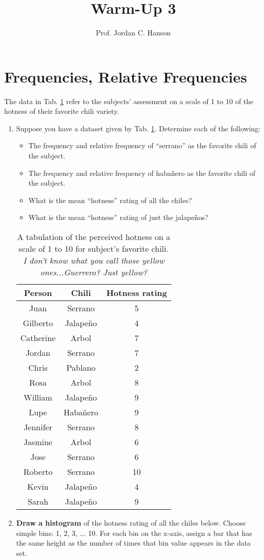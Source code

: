 \documentclass{article}
\begin{document}
\title{Warm-Up 3}
\author{Prof. Jordan C. Hanson}

\maketitle

\section{Frequencies, Relative Frequencies}
The data in Tab. \ref{tab:data} refer to the subjects' assessment on a scale of 1 to 10 of the hotness of their favorite chili variety.
\begin{enumerate}
\item Suppose you have a dataset given by Tab. \ref{tab:data}.  Determine each of the following:
\begin{itemize}
\item The frequency and relative frequency of ``serrano'' as the favorite chili of the subject.
\item The frequency and relative frequency of haba\~{n}ero as the favorite chili of the subject.
\item What is the mean ``hotness'' rating of all the chiles?
\item What is the mean ``hotness'' rating of just the jalape\~{n}os?
\end{itemize}
\begin{table}[ht]
\centering
\begin{tabular}{| c | c | c |}
\hline 
\hline
Person & Chili & Hotness rating \\ \hline
Juan & Serrano & 5 \\ \hline
Gilberto & Jalape\~{n}o & 4 \\ \hline
Catherine & Arbol & 7 \\ \hline
Jordan & Serrano & 7 \\ \hline
Chris & Pablano & 2 \\ \hline
Rosa & Arbol & 8 \\ \hline
William & Jalape\~{n}o & 9 \\ \hline
Lupe & Haba\~{n}ero & 9 \\ \hline
Jennifer & Serrano & 8 \\ \hline
Jasmine & Arbol & 6 \\ \hline
Jose & Serrano & 6 \\ \hline
Roberto & Serrano & 10 \\ \hline
Kevin & Jalape\~{n}o & 4 \\ \hline
Sarah &  Jalape\~{n}o & 9 \\ \hline
\hline
\end{tabular}
\caption{\label{tab:data} A tabulation of the perceived hotness on a scale of 1 to 10 for subject's favorite chili.  \textit{I don't know what you call those yellow ones...Guerrero? Just yellow?}}
\end{table}
\item \textbf{Draw a histogram} of the hotness rating of all the chiles below.  Choose simple bins: 1, 2, 3, ... 10.  For each bin on the x-axis, assign a bar that has the same height as the number of times that bin value appears in the data set.
\end{enumerate}
\end{document}
